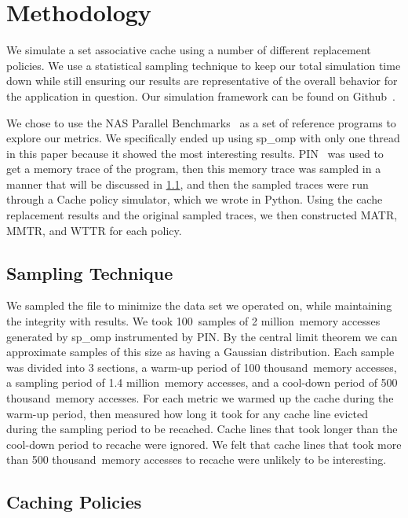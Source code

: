 \newcommand{\SAMPN}{100}
\newcommand{\SAMPK}{2 million}
\newcommand{\SAMP}{1.4 million}
\newcommand{\WARM}{100 thousand}
\newcommand{\COOL}{500 thousand}

\section{Methodology}
We simulate a set associative cache using a number of different
replacement policies.
We use a statistical sampling technique to keep our total simulation
time down while still ensuring our results are representative of the
overall behavior for the application in question.
Our simulation framework can be found on Github~\cite{spock13}.

We chose to use the NAS Parallel Benchmarks~\cite{bailey94} as a set of reference programs to explore our metrics.
We specifically ended up using sp\_omp with only one thread in this paper because it showed the most interesting results.
PIN~\cite{lukcohn05} was used to get a memory trace of the program,
 then this memory trace was sampled in a manner that will be discussed in \ref{sec:sampling},
 and then the sampled traces were run through a Cache policy simulator, which we wrote in Python.
Using the cache replacement results and the original sampled traces, we then constructed MATR, MMTR, and WTTR for each policy.

\subsection{Sampling Technique}
\label{sec:sampling}
We sampled the file to minimize the data set we operated on, while maintaining the integrity with results.
	We took \SAMPN~samples of \SAMPK~memory accesses generated by sp\_omp instrumented by PIN.
	By the central limit theorem we can approximate samples of this size as having a Gaussian distribution.
	Each sample was divided into 3 sections, a warm-up period of \WARM~memory accesses,
		a sampling period of \SAMP~memory accesses, and a cool-down period of \COOL~memory accesses.
	For each metric we warmed up the cache during the warm-up period,
		then measured how long it took for any cache line evicted during the sampling period to be recached.
	Cache lines that took longer than the cool-down period to recache were ignored.
	We felt that cache lines that took more than \COOL~memory accesses to recache were unlikely to be interesting.

\subsection{Caching Policies}
\label{sec:policies}

